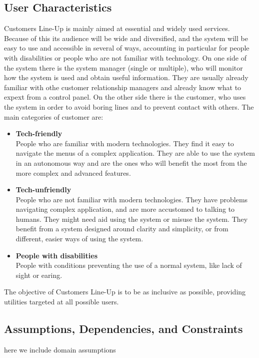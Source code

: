 \subsection{User Characteristics}
Customers Line-Up is mainly aimed at essential and widely used services.
Because of this its audience will be wide and diversified, and the system will be easy to use and accessible in several of ways, accounting in particular for people with disabilities or people who are not familiar with technology.
On one side of the system there is the system manager (single or multiple), who will monitor how the system is used and obtain useful information.
They are usually already familiar with othe customer relationship managers and already know what to expext from a control panel.
On the other side there is the customer, who uses the system in order to avoid boring lines and to prevent contact with others.
The main categories of customer are:
\begin{itemize}
    \item \textbf{Tech-friendly}\\
        People who are familiar with modern technologies. They find it easy to navigate the menus of a complex application.
        They are able to use the system in an autonomous way and are the ones who will benefit the most from the more complex and advanced features.
    \item \textbf{Tech-unfriendly}\\
        People who are not familiar with modern technologies. They have problems navigating complex application, and are more accustomed to talking to humans.
        They might need aid using the system or misuse the system. They benefit from a system designed around clarity and simplicity, or from different, easier ways of using the system.
    \item \textbf{People with disabilities}\\
        People with conditions preventing the use of a normal system, like lack of sight or earing.
\end{itemize}
The objective of Customers Line-Up is to be as inclusive as possible, providing utilities targeted at all possible users.

\subsection{Assumptions, Dependencies, and Constraints}
here we include domain assumptions 